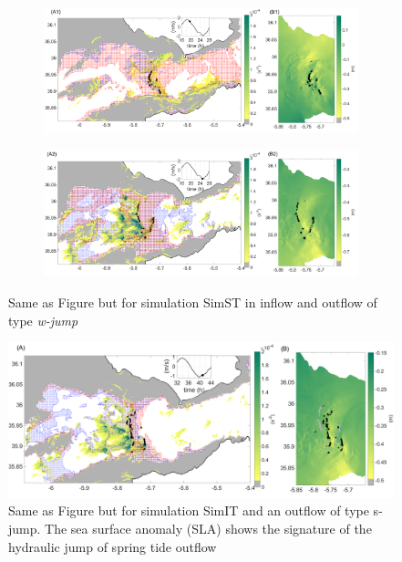 \begin{figure}[!h]
 \centering
\begin{subfigure}{\linewidth}
\centering
\includegraphics[width=\linewidth]{./GBR3D/VE2_19h30_corrC1.png}
\end{subfigure}

\begin{subfigure}{\linewidth}
\centering
\includegraphics[width=\linewidth]{./GBR3D/VE2_25h_corrC1.png}
\end{subfigure}
\caption [Supercritical flow, location of hydraulic jump, standard deviation of parameter $Q$ in SimST.]{Same as Figure  but for simulation SimST in inflow and outflow of type \textit{w-jump}}
\label{FigHCS}
\end{figure}

\begin{figure}[!h]
 \centering
\includegraphics[width=\linewidth]{./GBR3D/IES_41h_corrC1.png}
 \caption [Supercritical flow, location of hydraulic jump, standard deviation of parameter $Q$ in SimIT.]{Same as Figure  but for simulation SimIT and an outflow of type {s-jump}. The sea surface anomaly (SLA) shows the signature of the hydraulic jump of spring tide outflow}
 \label{FigHCI}
\end{figure}

